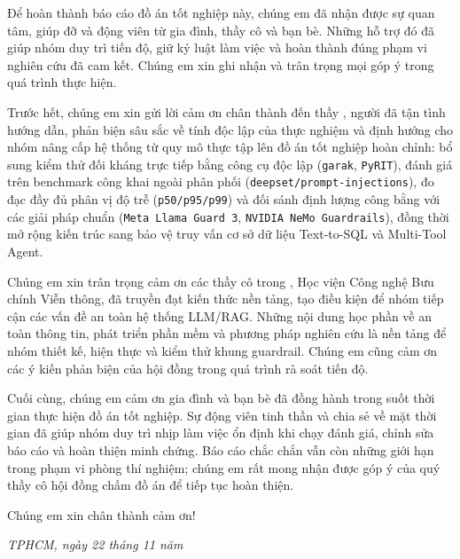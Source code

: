 \begin{acknowledgments}
\setlength{\parskip}{4pt}
Để hoàn thành báo cáo đồ án tốt nghiệp này, chúng em đã nhận được sự quan tâm, giúp đỡ và động viên từ gia đình, thầy cô và bạn bè. Những hỗ trợ đó đã giúp nhóm duy trì tiến độ, giữ kỷ luật làm việc và hoàn thành đúng phạm vi nghiên cứu đã cam kết. Chúng em xin ghi nhận và trân trọng mọi góp ý trong quá trình thực hiện.

Trước hết, chúng em xin gửi lời cảm ơn chân thành đến thầy \textbf{\supervisor}, người đã tận tình hướng dẫn, phản biện sâu sắc về tính độc lập của thực nghiệm và định hướng cho nhóm nâng cấp hệ thống từ quy mô thực tập lên đồ án tốt nghiệp hoàn chỉnh: bổ sung kiểm thử đối kháng trực tiếp bằng công cụ độc lập (\texttt{garak}, \texttt{PyRIT}), đánh giá trên benchmark công khai ngoài phân phối (\texttt{deepset/prompt-injections}), đo đạc đầy đủ phân vị độ trễ (\texttt{p50/p95/p99}) và đối sánh định lượng công bằng với các giải pháp chuẩn (\texttt{Meta Llama Guard~3}, \texttt{NVIDIA NeMo Guardrails}), đồng thời mở rộng kiến trúc sang bảo vệ truy vấn cơ sở dữ liệu Text-to-SQL và Multi-Tool Agent.

Chúng em xin trân trọng cảm ơn các thầy cô trong \faculty, Học viện Công nghệ Bưu chính Viễn thông, đã truyền đạt kiến thức nền tảng, tạo điều kiện để nhóm tiếp cận các vấn đề an toàn hệ thống LLM/RAG. Những nội dung học phần về an toàn thông tin, phát triển phần mềm và phương pháp nghiên cứu là nền tảng để nhóm thiết kế, hiện thực và kiểm thử khung guardrail. Chúng em cũng cảm ơn các ý kiến phản biện của hội đồng trong quá trình rà soát tiến độ.

Cuối cùng, chúng em cảm ơn gia đình và bạn bè đã đồng hành trong suốt thời gian thực hiện đồ án tốt nghiệp. Sự động viên tinh thần và chia sẻ về mặt thời gian đã giúp nhóm duy trì nhịp làm việc ổn định khi chạy đánh giá, chỉnh sửa báo cáo và hoàn thiện minh chứng. Báo cáo chắc chắn vẫn còn những giới hạn trong phạm vi phòng thí nghiệm; chúng em rất mong nhận được góp ý của quý thầy cô hội đồng chấm đồ án để tiếp tục hoàn thiện.

Chúng em xin chân thành cảm ơn!

\vspace{0.3cm}
\begin{flushright}
    \textit{TPHCM, ngày 22 tháng 11 năm \yearsubmit} \\
     \\
     \\[0.85cm]
    \makebox[8cm][c]{\textbf{\studentname} --- \textbf{\studentnametwo}}\\
\end{flushright}
\end{acknowledgments}
